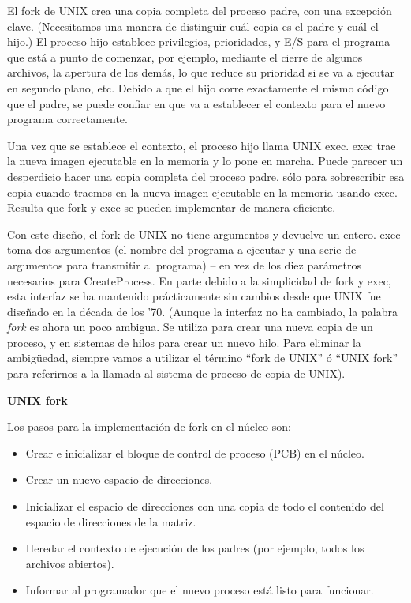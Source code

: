 \documentclass[10pt]{book}
\begin{document}
El {\mf fork} de UNIX crea una copia completa del proceso padre, con una excepción clave. (Necesitamos una manera de distinguir cuál copia es el padre y cuál el hijo.) El proceso hijo establece privilegios, prioridades, y E/S para el programa que está a punto de comenzar, por ejemplo, mediante el cierre de algunos archivos, la apertura de los demás, lo que reduce su prioridad si se va a ejecutar en segundo plano, etc. Debido a que el hijo corre exactamente el mismo código que el padre, se puede confiar en que va a establecer el contexto para el nuevo programa correctamente.

Una vez que se establece el contexto, el proceso hijo llama UNIX {\mf exec}. {\mf exec} trae la nueva imagen ejecutable en la memoria y lo pone en marcha. Puede parecer un desperdicio hacer una copia completa del proceso padre, sólo para sobrescribir esa copia cuando traemos en la nueva imagen ejecutable en la memoria usando {\mf exec}. Resulta que {\mf fork} y {\mf exec} se pueden implementar de manera eficiente.

Con este diseño, el {\mf fork} de UNIX no tiene argumentos y devuelve un entero. {\mf exec} toma dos argumentos (el nombre del programa a ejecutar y una serie de argumentos para transmitir al programa) -- en vez de los diez parámetros necesarios para {\mf CreateProcess}. En parte debido a la simplicidad de {\mf fork} y {\mf exec}, esta interfaz se ha mantenido prácticamente sin cambios desde que UNIX fue diseñado en la década de los '70. (Aunque la interfaz no ha cambiado, la palabra \textit{fork} es ahora un poco ambigua. Se utiliza para crear una nueva copia de un proceso, y en sistemas de hilos para crear un nuevo hilo. Para eliminar la ambigüedad, siempre vamos a utilizar el término ``{\mf fork} de UNIX'' ó ``UNIX {\mf fork}'' para referirnos a la llamada al sistema de proceso de copia de UNIX).

\textbf{UNIX {\mf fork}}

Los pasos para la implementación de {\mf fork} en el núcleo son:
\begin{itemize}
\item Crear e inicializar el bloque de control de proceso (PCB) en el núcleo.
\item Crear un nuevo espacio de direcciones.
\item Inicializar el espacio de direcciones con una copia de todo el contenido del espacio de direcciones de la matriz.
\item Heredar el contexto de ejecución de los padres (por ejemplo, todos los archivos abiertos).
\item Informar al programador que el nuevo proceso está listo para funcionar.
\end{itemize}
\end{document}
